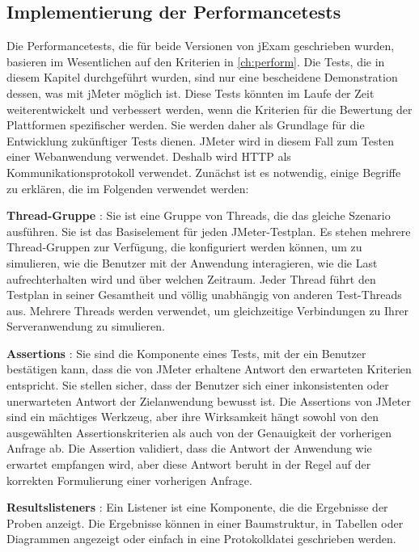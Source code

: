 \subsection{Implementierung der Performancetests}

Die Performancetests, die für beide Versionen von jExam geschrieben wurden,
basieren im Wesentlichen auf den Kriterien in  \autoref{ch:perform}. Die Tests, die
in diesem Kapitel durchgeführt wurden, sind nur eine bescheidene Demonstration
dessen, was mit jMeter möglich ist. Diese Tests könnten im Laufe der Zeit
weiterentwickelt und verbessert werden, wenn die Kriterien für die Bewertung
der Plattformen spezifischer werden. Sie werden daher als Grundlage für die
Entwicklung zukünftiger Tests dienen. JMeter wird in diesem Fall zum Testen
einer Webanwendung verwendet. Deshalb wird HTTP als Kommunikationsprotokoll
verwendet. Zunächst ist es notwendig, einige Begriffe zu erklären, die im
Folgenden verwendet werden:

\textbf{Thread-Gruppe} : Sie ist eine Gruppe von Threads, die das gleiche
Szenario ausführen. Sie ist das Basiselement für jeden JMeter-Testplan. Es
stehen mehrere Thread-Gruppen zur Verfügung, die konfiguriert werden können,
um zu simulieren, wie die Benutzer mit der Anwendung interagieren, wie die
Last aufrechterhalten wird und über welchen Zeitraum. Jeder Thread führt
den Testplan in seiner Gesamtheit und völlig unabhängig von anderen
Test-Threads aus. Mehrere Threads werden verwendet, um gleichzeitige
Verbindungen zu Ihrer Serveranwendung zu simulieren.

\textbf{Assertions} : Sie sind die Komponente eines Tests, mit der ein
Benutzer bestätigen kann, dass die von JMeter erhaltene Antwort den
erwarteten Kriterien entspricht. Sie stellen sicher, dass der Benutzer sich
einer inkonsistenten oder unerwarteten Antwort der Zielanwendung bewusst
ist. Die Assertions von JMeter sind ein mächtiges Werkzeug, aber ihre
Wirksamkeit hängt sowohl von den ausgewählten Assertionskriterien als auch
von der Genauigkeit der vorherigen Anfrage ab. Die Assertion validiert, dass
die Antwort der Anwendung wie erwartet empfangen wird, aber diese Antwort
beruht in der Regel auf der korrekten Formulierung einer vorherigen Anfrage.


\textbf{Resultslisteners} : Ein Listener ist eine Komponente, die die
Ergebnisse der Proben anzeigt. Die Ergebnisse können in einer Baumstruktur,
in Tabellen oder Diagrammen angezeigt oder einfach in eine Protokolldatei
geschrieben werden.



